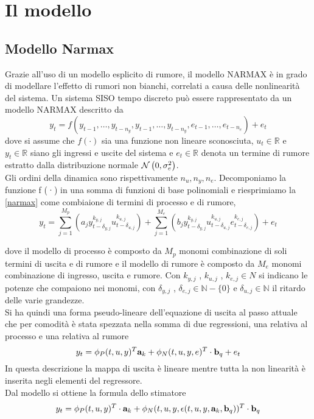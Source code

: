 \chapter{Il modello}
\section{Modello Narmax}
Grazie all’uso di un modello esplicito di rumore, il modello NARMAX è in grado
di modellare l’effetto di rumori non bianchi, correlati a causa delle nonlinearità del
sistema.
Un sistema SISO tempo discreto può essere rappresentato da un modello NARMAX
descritto da
\begin{equation}
y_t=f(y_{t-1},\dots, y_{t-n_y},y_{t-1},\dots, y_{t-n_y},e_{t-1},\dots, e_{t-n_e})+e_t
\label{narmax}
\end{equation}
dove si assume che $f(\cdot)$ sia una funzione non lineare sconosciuta, $u_t\in\mathbb{R}$ e $y_t\in\mathbb{R}$ siano gli ingressi e uscite del sistema e $e_t\in\mathbb{R}$ denota un termine di rumore estratto dalla distribuzione normale $\mathcal{N}\left(0,\sigma_e^2\right)$.\\
Gli ordini della dinamica sono rispettivamente $n_u,n_y,n_e$.
Decomponiamo la funzione f (·) in una somma di funzioni di base polinomiali e
riesprimiamo la \ref{narmax} come combiaione di termini di processo e di rumore,
\begin{equation}
y_t=\sum_{j=1}^{M_p}\left(a_j y_{t-	\delta_{y,j}}^{k_{y,j}} u_{t-	\delta_{u,j}}^{k_{u,j}}\right)+
\sum_{j=1}^{M_e}\left(b_j y_{t-	\delta_{y,j}}^{k_{y,j}} u_{t-	\delta_{u,j}}^{k_{u,j}}
e_{t-	\delta_{e,j}}^{k_{e,j}}\right)+e_t
\end{equation}

dove il modello di processo è composto da $M_p$ monomi combinazione di soli termini
di uscita e di rumore e il modello di rumore è composto da $M_e$ monomi combinazione
di ingresso, uscita e rumore. Con $k_{y,j}$ , $k_{u,j}$ , $k_{e,j}\in N$ si indicano le potenze che compaiono nei monomi, con $\delta_{ y,j}$ , $\delta_{ e,j}\in \mathbb{N}-\{0\}$ e
$\delta_{ u,j}\in \mathbb{N}$ il ritardo delle varie grandezze.\\
Si ha quindi una forma pseudo-lineare dell'equazione di uscita
al passo attuale che per comodità è stata spezzata nella somma di due regressioni, una relativa al processo e una relativa al rumore
\begin{equation}
y_t=\phi_P(t,u,y)^T\textbf{a}_k+\phi_N(t,u,y,e)^T\cdot\textbf{b}_q+e_t
\end{equation}
In questa descrizione la mappa di uscita è lineare mentre tutta la non linearità è inserita negli elementi del regressore.\\
Dal modello si ottiene la formula dello stimatore
\begin{equation}
y_t=\phi_P(t,u,y)^T\cdot\textbf{a}_k+\phi_N(t,u,y,\epsilon(t,u,y,\textbf{a}_k,\textbf{b}_q))^T\cdot\textbf{b}_q
\end{equation} 

